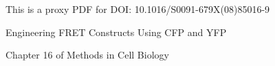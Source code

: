 \documentclass[letterpaper]{article}
\begin{document}
 
This is a proxy PDF for DOI: 10.1016/S0091-679X(08)85016-9

Engineering FRET Constructs Using CFP and YFP

Chapter 16 of Methods in Cell Biology 
\end{document}
